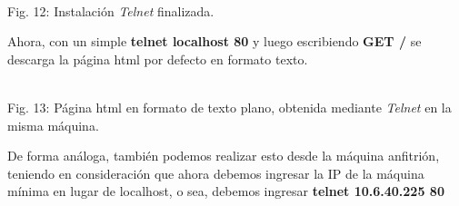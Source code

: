 \documentclass[11pt]{article}
\begin{document}
\begin{minipage}[t]{\linewidth}
    \raggedright
\medskip
     \\Fig. 12: Instalación \textit{Telnet} finalizada.\\
\end{minipage}
\newpage
Ahora, con un simple \textbf{telnet localhost 80} y luego escribiendo \textbf{GET /} se descarga la página html por defecto en formato texto.\\

\begin{minipage}[t]{\linewidth}
    \raggedright
\medskip
     \\Fig. 13: Página html en formato de texto plano, obtenida mediante \textit{Telnet} en la misma máquina.\\
\end{minipage}

De forma análoga, también podemos realizar esto desde la máquina anfitrión, teniendo en consideración que ahora debemos ingresar la IP de la máquina mínima en lugar de localhost, o sea, debemos ingresar \textbf{telnet 10.6.40.225 80}\\
\end{document}
